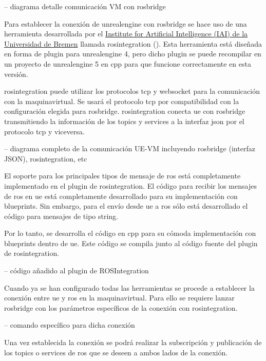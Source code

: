 \documentclass[a4paper, 12pt, spanish, twoside]{article}
\begin{document}
-- diagrama detalle comunicación VM con rosbridge 

Para establecer la conexión de \gls{unrealengine} con \gls{rosbridge} se hace uso de una herramienta desarrollada por el \href{https://ai.uni-bremen.de/}{Institute for Artificial Intelligence (IAI) de la Universidad de Bremen} llamada \gls{rosintegration} (\cite{mania19scenarios}). Esta herramienta está diseñada en forma de \gls{plugin} para \gls{unrealengine} 4, pero dicho \gls{plugin} se puede recompilar en un proyecto de \gls{unrealengine} 5 en \gls{cpp} para que funcione correctamente en esta versión. 

\gls{rosintegration} puede utilizar los protocolos \acrshort{tcp} y \gls{websocket} para la comunicación con la \gls{maquinavirtual}. Se usará el protocolo \acrshort{tcp} por compatibilidad con la configuración elegida para \gls{rosbridge}. \gls{rosintegration} conecta \acrshort{ue} con \gls{rosbridge} transmitiendo la información de los \glspl{topic} y \glspl{service} a la interfaz \acrshort{json} por el protocolo \acrshort{tcp} y viceversa. 

-- diagrama completo de la comunicación UE-VM incluyendo rosbridge (interfaz JSON), rosintegration, etc 

El soporte para los principales tipos de mensaje de \acrshort{ros} está completamente implementado en el \gls{plugin} de \gls{rosintegration}. El código para recibir los mensajes de \acrshort{ros} en \acrshort{ue} está completamente desarrollado para su implementación con \glspl{blueprint}. Sin embargo, para el envío desde \acrshort{ue} a \acrshort{ros} sólo está desarrollado el código para mensajes de tipo \Gls{string}.  

Por lo tanto, se desarrolla el código en \gls{cpp} para su cómoda implementación con \glspl{blueprint} dentro de \acrshort{ue}. Este código se compila junto al código fuente del \gls{plugin} de \gls{rosintegration}. 

-- código añadido al plugin de ROSIntegration 

Cuando ya se han configurado todas las herramientas se procede a establecer la conexión entre \acrshort{ue} y \acrshort{ros} en la \gls{maquinavirtual}. Para ello se requiere lanzar \gls{rosbridge} con los parámetros específicos de la conexión con \gls{rosintegration}.  

-- comando específico para dicha conexión 

Una vez establecida la conexión se podrá realizar la subscripción y publicación de los \glspl{topic} o \glspl{service} de \acrshort{ros} que se deseen a ambos lados de la conexión. 
\end{document}
